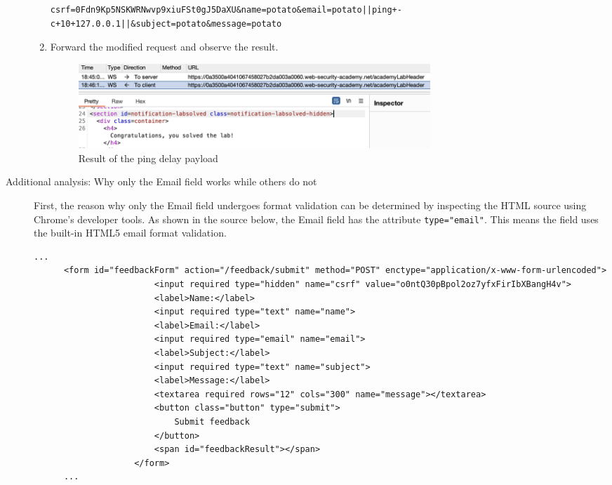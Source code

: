 \documentclass{article}
\begin{document}
\begin{description}
\begin{enumerate}
\begin{lstlisting}[label={lst:modified-request},caption={Modified request}]
      csrf=0Fdn9Kp5NSKWRNwvp9xiuFSt0gJ5DaXU&name=potato&email=potato||ping+-c+10+127.0.0.1||&subject=potato&message=potato
      \end{lstlisting}
      \item Forward the modified request and observe the result.
      \begin{figure}[htbp]
      \centering
      \includegraphics[width=0.7\textwidth]{../figure/figure4.png}
      \caption{Result of the ping delay payload}
      \label{fig:ping-result}
      \end{figure}

    \end{enumerate}

    \newpage
    \item[Additional analysis: Why only the Email field works while others do not]\leavevmode\par
    First, the reason why only the Email field undergoes format validation can be determined by inspecting the HTML source using Chrome's developer tools. As shown in the source below, the Email field has the attribute \texttt{type="email"}. This means the field uses the built-in HTML5 email format validation.

    \begin{lstlisting}[label={lst:modified-request},caption={HTML source code of the feedback form}]
      ...
      <form id="feedbackForm" action="/feedback/submit" method="POST" enctype="application/x-www-form-urlencoded">
                        <input required type="hidden" name="csrf" value="o0ntQ30pBpol2oz7yfxFirIbXBangH4v">
                        <label>Name:</label>
                        <input required type="text" name="name">
                        <label>Email:</label>
                        <input required type="email" name="email">
                        <label>Subject:</label>
                        <input required type="text" name="subject">
                        <label>Message:</label>
                        <textarea required rows="12" cols="300" name="message"></textarea>
                        <button class="button" type="submit">
                            Submit feedback
                        </button>
                        <span id="feedbackResult"></span>
                    </form>
      ...
    \end{lstlisting}


\end{description}
\end{document}
